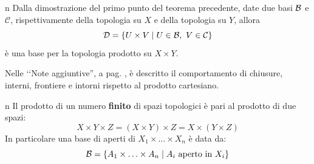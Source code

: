 \begin{remark}{n}
	Dalla dimostrazione del primo punto del teorema precedente, date due basi $\mathcal{B}$ e $\mathcal{C}$, rispettivamente della topologia su $X$ e della topologia su $Y$, allora
	\begin{equation*}
		\mathcal{D}=\left\{U\times V\middle| U\in\basis,\ V\in\mathcal{C}\right\}
	\end{equation*}
	è una base per la topologia prodotto su $X\times Y$.
\end{remark}
Nelle ‘‘Note aggiuntive'', a pag. \pageref{topologiaprodottostruttura}, è descritto il comportamento di chiusure, interni, frontiere e intorni rispetto al prodotto cartesiano.
\begin{remark}{n}
Il prodotto di un numero \textbf{finito} di spazi topologici è pari al prodotto di due spazi:
\begin{equation*}
X\times Y\times Z=\left(X\times Y\right)\times Z=X\times\left(Y\times Z\right)
\end{equation*}
In particolare una base di aperti di $X_1\times \ldots \times X_n$ è data da:
\begin{equation*}
\basis=\left\{A_1\times \ldots \times A_n\middle| A_i\text{ aperto in } X_i\right\}
\end{equation*}
\end{remark}
